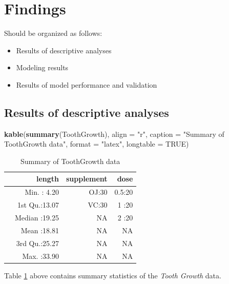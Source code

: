 \documentclass[12pt,oneside]{chicagocapstone}
\newenvironment{Shaded}{\begin{snugshade}}{\end{snugshade}}
\newcommand{\KeywordTok}[1]{\textcolor[rgb]{0.13,0.29,0.53}{\textbf{#1}}}
\newcommand{\DataTypeTok}[1]{\textcolor[rgb]{0.13,0.29,0.53}{#1}}
\newcommand{\StringTok}[1]{\textcolor[rgb]{0.31,0.60,0.02}{#1}}
\newcommand{\OtherTok}[1]{\textcolor[rgb]{0.56,0.35,0.01}{#1}}
\newcommand{\NormalTok}[1]{#1}
\providecommand{\tightlist}{%
  \setlength{\itemsep}{0pt}\setlength{\parskip}{0pt}}
\begin{document}
\chapter*{Findings}\label{findings}

Should be organized as follows:
\begin{itemize}
\tightlist
\item
  Results of descriptive analyses
\item
  Modeling results
\item
  Results of model performance and validation
\end{itemize}
\section*{Results of descriptive analyses}\label{findings-descriptive}
\begin{Shaded}
\begin{Highlighting}[]
\KeywordTok{kable}\NormalTok{(}\KeywordTok{summary}\NormalTok{(ToothGrowth), }\DataTypeTok{align =} \StringTok{"r"}\NormalTok{, }\DataTypeTok{caption =} \StringTok{"Summary of ToothGrowth data"}\NormalTok{,}
      \DataTypeTok{format =} \StringTok{"latex"}\NormalTok{, }\DataTypeTok{longtable =} \OtherTok{TRUE}\NormalTok{)}
\end{Highlighting}
\end{Shaded}
\begin{longtable}{l|r|r|r}
\caption{\label{tab:summary}Summary of ToothGrowth data}\\
\hline
  &     length & supplement &  dose\\
\hline
 & Min.   : 4.20 & OJ:30 & 0.5:20\\
\hline
 & 1st Qu.:13.07 & VC:30 & 1  :20\\
\hline
 & Median :19.25 & NA & 2  :20\\
\hline
 & Mean   :18.81 & NA & NA\\
\hline
 & 3rd Qu.:25.27 & NA & NA\\
\hline
 & Max.   :33.90 & NA & NA\\
\hline
\end{longtable}
Table \ref{tab:summary} above contains summary statistics of the
\emph{Tooth Growth} data.
\end{document}
